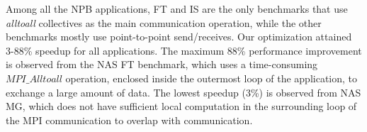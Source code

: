 Among all the NPB applications, FT and IS are the only benchmarks that use {\em alltoall} collectives as the main communication operation, while the other benchmarks mostly use point-to-point send/receives.
Our optimization attained 3-88\% speedup for all applications.
The maximum 88\% performance improvement is observed from the NAS FT benchmark, which uses a time-consuming $MPI\_Alltoall$ operation, enclosed inside the outermost loop of the application,  to exchange a large amount of data.
The lowest speedup (3\%) is observed from NAS MG, which does not have sufficient local computation in the surrounding loop of the MPI communication to overlap with communication. 




